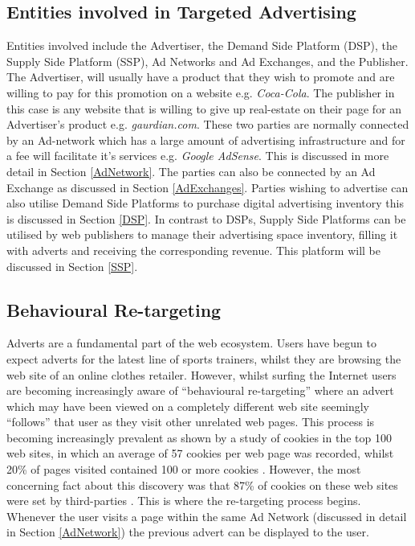 \documentclass[12pt]{article}
\begin{document}
\subsection{Entities involved in Targeted Advertising}
Entities involved include the Advertiser, the Demand Side Platform (DSP), the Supply Side Platform (SSP), Ad Networks and Ad Exchanges, and the Publisher. The Advertiser, will usually have a product that they wish to promote and are willing to pay for this promotion on a website e.g. \textit{Coca-Cola}. The publisher in this case is any website that is willing to give up real-estate on their page for an Advertiser's product e.g. \textit{gaurdian.com}. These two parties are normally connected by an Ad-network which has a large amount of advertising infrastructure and for a fee will facilitate it's services e.g. \textit{Google AdSense}. This is discussed in more detail in Section \ref{AdNetwork}. The parties can also be connected by an Ad Exchange as discussed in Section \ref{AdExchanges}. Parties wishing to advertise can also utilise Demand Side Platforms to purchase digital advertising inventory this is discussed in Section \ref{DSP}. In contrast to DSPs, Supply Side Platforms can be utilised by web publishers to manage their advertising space inventory, filling it with adverts and receiving the corresponding revenue. This platform will be discussed in Section \ref{SSP}.  

\subsection{Behavioural Re-targeting}
Adverts are a fundamental part of the web ecosystem. Users have begun to expect adverts for the latest line of sports trainers, whilst they are browsing the web site of an online clothes retailer. However, whilst surfing the Internet users are becoming increasingly aware of ``behavioural re-targeting'' where an advert which may have been viewed on a completely different web site seemingly ``follows'' that user as they visit other unrelated web pages. This process is becoming increasingly prevalent as shown by a study of cookies in the top 100 web sites, in which an average of 57 cookies per web page was recorded, whilst 20\% of pages visited contained 100 or more cookies \parencite{taOffer}. However, the most concerning fact about this discovery was that 87\% of cookies on these web sites were set by third-parties \parencite{taOffer}. This is where the re-targeting process begins. Whenever the user visits a page within the same Ad Network (discussed in detail in Section \ref{AdNetwork}) the previous advert can be displayed to the user. \newline
\end{document}
